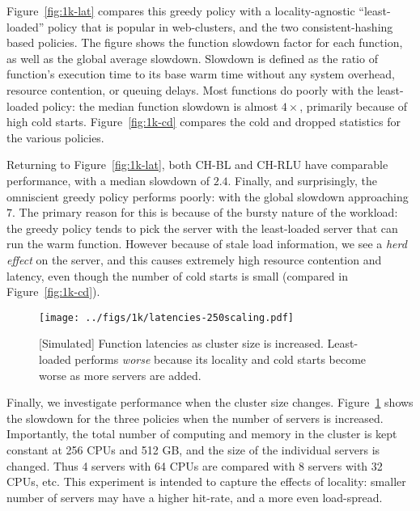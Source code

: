 Figure~\ref{fig:1k-lat} compares this greedy policy with a locality-agnostic ``least-loaded'' policy that is popular in web-clusters, and the two consistent-hashing based policies. 
The figure shows the function slowdown factor for each function, as well as the global average slowdown.
Slowdown is defined as the ratio of function's execution time to its base warm time without any system overhead, resource contention, or queuing delays.
Most functions do poorly with the least-loaded policy: the median function slowdown is almost $4\times$, primarily because of high cold starts.
Figure~\ref{fig:1k-cd} compares the cold and dropped statistics for the various policies.

Returning to Figure~\ref{fig:1k-lat}, both CH-BL and CH-RLU have comparable performance, with a median slowdown of $2.4$. 
Finally, and surprisingly, the omniscient greedy policy performs poorly: with the global slowdown approaching $7$.
The primary reason for this is because of the bursty nature of the workload: the greedy policy tends to pick the server with the least-loaded server that can run the warm function.
However because of stale load information, we see a \emph{herd effect} on the server, and this causes extremely high resource contention and latency, even though the number of cold starts is small (compared in Figure~\ref{fig:1k-cd}). 



\begin{figure}
  \centering
  \texttt{[image: ../figs/1k/latencies-250scaling.pdf]}
    \vspace*{-0.3cm}
  \caption{[Simulated] Function latencies as cluster size is increased. Least-loaded performs \emph{worse} because its locality and cold starts become worse as more servers are added.}
  \label{fig:1k-scaling}
    \vspace*{-0.3cm}
\end{figure}


Finally, we investigate performance when the cluster size changes.
Figure~\ref{fig:1k-scaling} shows the slowdown for the three policies when the number of servers is increased.
Importantly, the total number of computing and memory in the cluster is kept constant at 256 CPUs and 512 GB, and the size of the individual servers is changed.
Thus 4 servers with 64 CPUs are compared with 8 servers with 32 CPUs, etc.
This experiment is intended to capture the effects of locality: smaller number of servers may have a higher hit-rate, and a more even load-spread.

